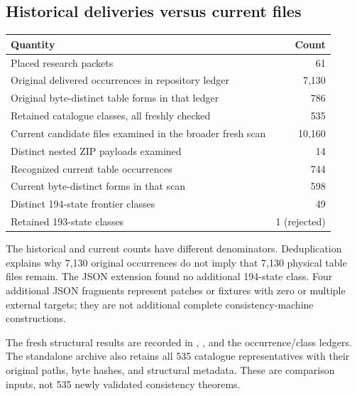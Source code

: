 \documentclass[11pt]{article}
\newcommand{\code}[1]{\texttt{\detokenize{#1}}}
\begin{document}
\subsection{Historical deliveries versus current files}
\begin{center}
\begin{tabular}{lr}
\toprule
Quantity & Count\\
\midrule
Placed research packets &61\\
Original delivered \code{.tm} occurrences in repository ledger &7,130\\
Original byte-distinct table forms in that ledger &786\\
Retained catalogue classes, all freshly checked &535\\
Current candidate files examined in the broader fresh scan &10,160\\
Distinct nested ZIP payloads examined &14\\
Recognized current table occurrences &744\\
Current byte-distinct forms in that scan &598\\
Distinct 194-state frontier classes &49\\
Retained 193-state classes &1 (rejected)\\
\bottomrule
\end{tabular}
\end{center}
The historical and current counts have different denominators. Deduplication explains why 7,130 original occurrences do not imply that 7,130 physical table files remain. The JSON extension found no additional 194-state class. Four additional JSON fragments represent patches or fixtures with zero or multiple external targets; they are not additional complete consistency-machine constructions.

The fresh structural results are recorded in , , and the occurrence/class ledgers. The standalone archive also retains all 535 catalogue representatives with their original paths, byte hashes, and structural metadata. These are comparison inputs, not 535 newly validated consistency theorems.
\end{document}
